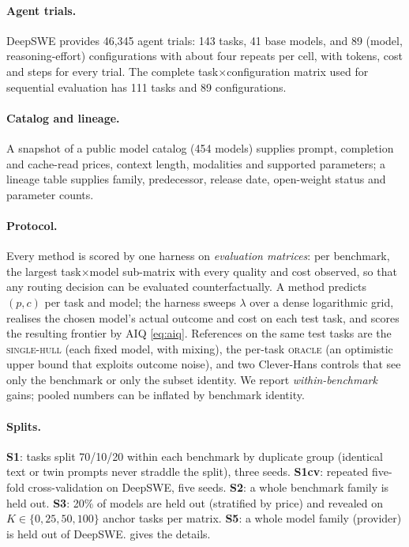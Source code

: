 \documentclass[11pt,a4paper]{article}
\theoremstyle{definition}
\theoremstyle{remark}
\theoremstyle{definition}
\begin{document}
\paragraph{Agent trials.}
DeepSWE provides 46{,}345 agent trials: 143 tasks, 41 base models, and 89 (model, reasoning-effort) configurations with about four repeats per cell, with tokens, cost and steps for every trial. The complete task$\times$configuration matrix used for sequential evaluation has 111 tasks and 89 configurations.

\paragraph{Catalog and lineage.}
A snapshot of a public model catalog (454 models) supplies prompt, completion and cache-read prices, context length, modalities and supported parameters; a lineage table supplies family, predecessor, release date, open-weight status and parameter counts.

\paragraph{Protocol.}
Every method is scored by one harness on \emph{evaluation matrices}: per benchmark, the largest task$\times$model sub-matrix with every quality and cost observed, so that any routing decision can be evaluated counterfactually. A method predicts $(p,c)$ per task and model; the harness sweeps $\lambda$ over a dense logarithmic grid, realises the chosen model's actual outcome and cost on each test task, and scores the resulting frontier by AIQ \eqref{eq:aiq}. References on the same test tasks are the \textsc{single-hull} (each fixed model, with mixing), the per-task \textsc{oracle} (an optimistic upper bound that exploits outcome noise), and two Clever-Hans controls that see only the benchmark or only the subset identity. We report \emph{within-benchmark} gains; pooled numbers can be inflated by benchmark identity.

\paragraph{Splits.}
\textbf{S1}: tasks split 70/10/20 within each benchmark by duplicate group (identical text or twin prompts never straddle the split), three seeds. \textbf{S1cv}: repeated five-fold cross-validation on DeepSWE, five seeds. \textbf{S2}: a whole benchmark family is held out. \textbf{S3}: 20\% of models are held out (stratified by price) and revealed on $K\in\{0,25,50,100\}$ anchor tasks per matrix. \textbf{S5}: a whole model family (provider) is held out of DeepSWE.  gives the details.
\end{document}
